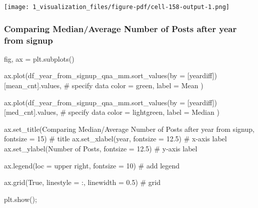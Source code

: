 \documentclass[
  letterpaper,
  DIV=11,
  numbers=noendperiod]{scrartcl}
\newenvironment{Shaded}{\begin{snugshade}}{\end{snugshade}}
\newcommand{\CommentTok}[1]{\textcolor[rgb]{0.37,0.37,0.37}{#1}}
\newcommand{\DecValTok}[1]{\textcolor[rgb]{0.68,0.00,0.00}{#1}}
\newcommand{\FloatTok}[1]{\textcolor[rgb]{0.68,0.00,0.00}{#1}}
\newcommand{\NormalTok}[1]{\textcolor[rgb]{0.00,0.23,0.31}{#1}}
\newcommand{\OperatorTok}[1]{\textcolor[rgb]{0.37,0.37,0.37}{#1}}
\newcommand{\StringTok}[1]{\textcolor[rgb]{0.13,0.47,0.30}{#1}}
\newcommand{\VariableTok}[1]{\textcolor[rgb]{0.07,0.07,0.07}{#1}}
\begin{document}
\texttt{[image: 1\_visualization\_files/figure-pdf/cell-158-output-1.png]}

\subsubsection{Comparing Median/Average Number of Posts after year from
signup}\label{comparing-medianaverage-number-of-posts-after-year-from-signup}

\begin{Shaded}
\begin{Highlighting}[]
\NormalTok{fig, ax }\OperatorTok{=}\NormalTok{ plt.subplots()}


\NormalTok{ax.plot(df\_year\_from\_signup\_qna\_mm.sort\_values(by }\OperatorTok{=}\NormalTok{ [}\StringTok{\textquotesingle{}yeardiff\textquotesingle{}}\NormalTok{])[}\StringTok{\textquotesingle{}mean\_cnt\textquotesingle{}}\NormalTok{].values, }\CommentTok{\# specify data}
\NormalTok{        color }\OperatorTok{=} \StringTok{\textquotesingle{}green\textquotesingle{}}\NormalTok{,}
\NormalTok{        label }\OperatorTok{=} \StringTok{\textquotesingle{}Mean\textquotesingle{}}
\NormalTok{) }




\NormalTok{ax.plot(df\_year\_from\_signup\_qna\_mm.sort\_values(by }\OperatorTok{=}\NormalTok{ [}\StringTok{\textquotesingle{}yeardiff\textquotesingle{}}\NormalTok{])[}\StringTok{\textquotesingle{}med\_cnt\textquotesingle{}}\NormalTok{].values, }\CommentTok{\# specify data}
\NormalTok{        color }\OperatorTok{=} \StringTok{\textquotesingle{}lightgreen\textquotesingle{}}\NormalTok{,}
\NormalTok{        label }\OperatorTok{=} \StringTok{\textquotesingle{}Median\textquotesingle{}}
\NormalTok{)}




\NormalTok{ax.set\_title(}\StringTok{\textquotesingle{}Comparing Median/Average Number of Posts after year from signup\textquotesingle{}}\NormalTok{, fontsize }\OperatorTok{=} \DecValTok{15}\NormalTok{) }\CommentTok{\# title}
\NormalTok{ax.set\_xlabel(}\StringTok{\textquotesingle{}year\textquotesingle{}}\NormalTok{, fontsize }\OperatorTok{=} \FloatTok{12.5}\NormalTok{) }\CommentTok{\# x{-}axis label}
\NormalTok{ax.set\_ylabel(}\StringTok{\textquotesingle{}Number of Posts\textquotesingle{}}\NormalTok{, fontsize }\OperatorTok{=} \FloatTok{12.5}\NormalTok{) }\CommentTok{\# y{-}axis label}

\NormalTok{ax.legend(loc }\OperatorTok{=} \StringTok{\textquotesingle{}upper right\textquotesingle{}}\NormalTok{, fontsize }\OperatorTok{=} \DecValTok{10}\NormalTok{) }\CommentTok{\# add legend}

\NormalTok{ax.grid(}\VariableTok{True}\NormalTok{, linestyle }\OperatorTok{=} \StringTok{\textquotesingle{}:\textquotesingle{}}\NormalTok{, linewidth }\OperatorTok{=} \FloatTok{0.5}\NormalTok{) }\CommentTok{\# grid}

\NormalTok{plt.show()}\OperatorTok{;}
\end{Highlighting}
\end{Shaded}
\end{document}
